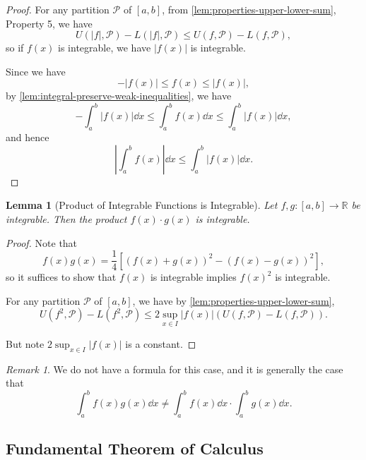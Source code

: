 \documentclass[11pt]{article}
\numberwithin{equation}{section}
\newtheorem{lemma}[theorem]{Lemma}
\theoremstyle{definition}
\theoremstyle{remark}
\newtheorem{remark}[theorem]{Remark}
\newcommand{\pqty}[1]{\left(#1\right)}
\newcommand{\bqty}[1]{\left[#1\right]}
\newcommand{\abs}[1]{\left|#1\right|}
\newcommand{\ccintv}[2]{[#1,#2]}
\newcommand{\functiondomain}[3]{#1:#2\to #3}
\newcommand{\RR}{\mathbb R}
\newcommand{\partition}{\mathcal P}
\newcommand{\upperSum}{U}
\newcommand{\lowerSum}{L}
\begin{document}
\begin{proof}
    For any partition \(\partition\) of \(\ccintv{a}{b}\), from \autoref{lem:properties-upper-lower-sum}, Property 5, we have
    \[
        \upperSum\pqty{\abs{f}, \partition} - \lowerSum\pqty{\abs{f}, \partition} \leq \upperSum\pqty{f, \partition} - \lowerSum\pqty{f, \partition},
    \]
    so if \(f \pqty{x}\) is integrable, we have \(\abs{f \pqty{x}}\) is integrable.

    Since we have
    \[
        - \abs{f \pqty{x}} \leq f\pqty{x} \leq \abs{f\pqty{x}},
    \]
    by \autoref{lem:integral-preserve-weak-inequalities}, we have
    \[
        -\int_{a}^{b} \abs{f\pqty{x}} \dd{x} \leq \int_{a}^{b} f\pqty{x} \dd{x} \leq \int_{a}^{b} \abs{f\pqty{x}} \dd{x},
    \]
    and hence
    \[
        \abs{\int_{a}^{b} f\pqty{x}} \dd{x} \leq \int_{a}^{b} \abs{f\pqty{x}} \dd{x}.
    \]
\end{proof}

\begin{lemma}[Product of Integrable Functions is Integrable]\label{analysis-unit-0164}
    \label{lem:integral-product}%
    Let \(\functiondomain{f, g}{\ccintv{a}{b}}{\RR}\) be integrable. Then the product \(f\pqty{x} \cdot g\pqty{x}\) is integrable.
\end{lemma}

\begin{proof}
    Note that
    \[
        f\pqty{x} g\pqty{x} = \frac{1}{4} \bqty{\pqty{f\pqty{x} + g\pqty{x}}^2 - \pqty{f\pqty{x} - g\pqty{x}}^2},
    \]
    so it suffices to show that \(f\pqty{x}\) is integrable implies \(f\pqty{x}^2\) is integrable.

    For any partition \(\partition\) of \(\ccintv{a}{b}\), we have by \autoref{lem:properties-upper-lower-sum},
    \[
        \upperSum\pqty{f^2, \partition} - \lowerSum\pqty{f^2, \partition} \leq 2 \sup_{x \in I} \abs{f\pqty{x}} \pqty{\upperSum\pqty{f, \partition} - \lowerSum\pqty{f, \partition}}.
    \]

    But note \(2 \sup_{x \in I} \abs{f\pqty{x}}\) is a constant.
\end{proof}

\begin{remark}\label{analysis-unit-0165}
    We do not have a formula for this case, and it is generally the case that
    \[
        \int_{a}^{b} f\pqty{x} g\pqty{x} \dd{x} \neq \int_{a}^{b} f\pqty{x} \dd{x} \cdot \int_{a}^{b} g\pqty{x} \dd{x}.
    \]
\end{remark}

\subsection{Fundamental Theorem of Calculus}
\end{document}
